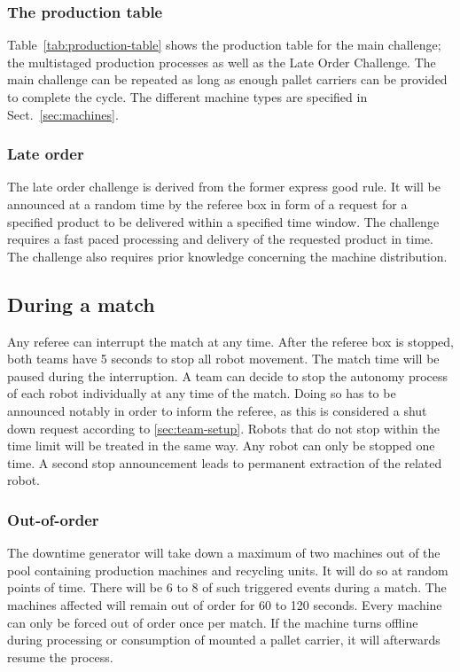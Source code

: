 \documentclass[12pt,twoside]{article}
\begin{document}
\subsubsection{The production table}

Table~\ref{tab:production-table} shows the production table for the
main challenge; the multistaged production processes as well as the
Late Order Challenge. The main challenge can be repeated as long as
enough pallet carriers can be provided to complete the cycle. The
different machine types are specified in Sect.~\ref{sec:machines}.



\subsubsection{Late order}

The late order challenge is derived from the former express good
rule. It will be announced at a random time by the referee box in form of a
request for a specified product to be delivered within a specified time
window. The challenge requires a fast paced processing and delivery of
the requested product in time. The challenge also requires prior
knowledge concerning the machine distribution.

\subsection{During a match}

Any referee can interrupt the match at any time. After the referee box
is stopped, both teams have 5 seconds to stop all robot movement. The
match time will be paused during the interruption. A team can decide to
stop the autonomy process of each robot individually at any time of the
match. Doing so has to be announced notably in order to inform the
referee, as this is considered a shut down request according to
\ref{sec:team-setup}. Robots that do not stop within the time limit
will be treated in the same way. Any robot can only be stopped one
time. A second stop announcement leads to permanent extraction of the
related robot.

\subsubsection{Out-of-order}

The downtime generator will take down a maximum of two machines out of
the pool containing production machines and recycling units. It will
do so at random points of time. There will be 6 to 8 of such triggered
events during a match. The machines affected will remain out of order
for 60 to 120 seconds. Every machine can only be forced out of order
once per match. If the machine turns offline during processing or
consumption of mounted a pallet carrier, it will afterwards resume the
process.
\end{document}
